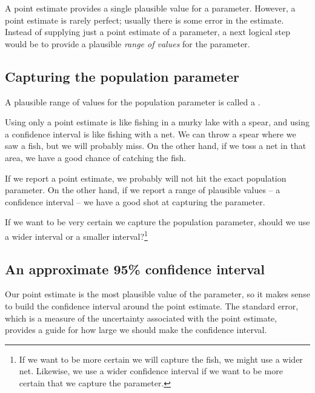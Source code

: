 A point estimate provides a single plausible value for a parameter. However, a point estimate is rarely perfect; usually there is some error in the estimate. Instead of supplying just a point estimate of a parameter, a next logical step would be to provide a plausible \emph{range of values} for the parameter.


\subsection{Capturing the population parameter}

A plausible range of values for the population parameter is called a .

Using only a point estimate is like fishing in a murky lake with a spear, and using a confidence interval is like fishing with a net. We can throw a spear where we saw a fish, but we will probably miss. On the other hand, if we toss a net in that area, we have a good chance of catching the fish.

If we report a point estimate, we probably will not hit the exact population parameter. On the other hand, if we report a range of plausible values -- a confidence interval -- we have a good shot at capturing the parameter. 

\begin{exercise}
If we want to be very certain we capture the population parameter, should we use a wider interval or a smaller interval?\footnote{If we want to be more certain we will capture the fish, we might use a wider net. Likewise, we use a wider confidence interval if we want to be more certain that we capture the parameter.}
\end{exercise}

\subsection{An approximate 95\% confidence interval}

Our point estimate is the most plausible value of the parameter, so it makes sense to build the confidence interval around the point estimate. The standard error, which is a measure of the uncertainty associated with the point estimate, provides a guide for how large we should make the confidence interval.

